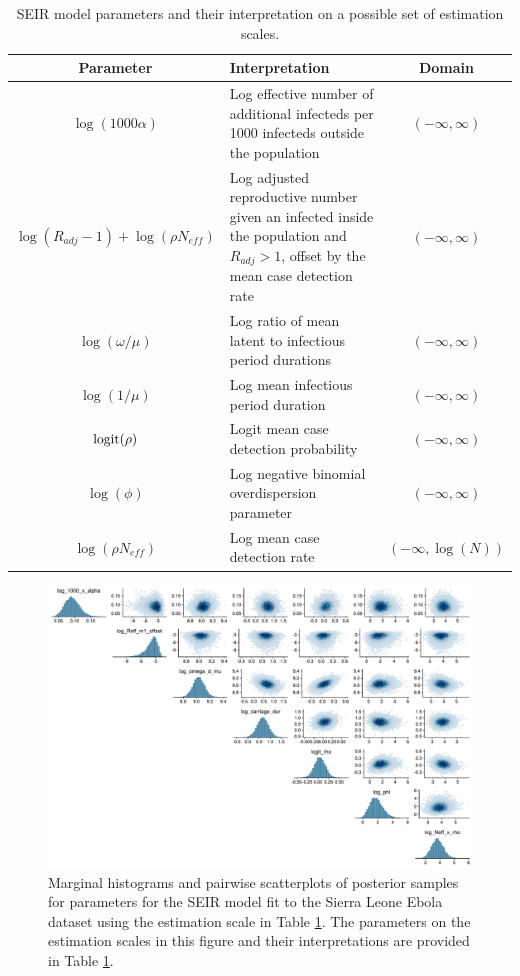\begin{table}[htbp]
	\caption{SEIR model parameters and their interpretation on a possible set of estimation scales.}
	\label{tab:seir_params_est3}
	\footnotesize
	\centering
	\begin{tabular}{clc}
		\hline
		\textbf{Parameter} & \textbf{Interpretation} & \textbf{Domain}\\
		\hline
		$\log(1000\alpha)$ & \makecell[l]{Log effective number of additional infecteds per \\ 1000 infecteds outside the population} & $(-\infty,\infty) $ \\
		$ \log(R_{adj} - 1) + \log(\rho N_{eff}) $ & \makecell[l]{Log adjusted reproductive number given an infected\\ inside the population and $ R_{adj} > 1 $, offset\\ by the mean case detection rate} & $(-\infty,\infty) $\\
		$ \log(\omega/\mu) $ & Log ratio of mean latent to infectious period durations & $(-\infty,\infty) $\\
		$ \log(1/\mu) $ & Log mean infectious period duration & $ (-\infty,\infty) $\\
		$ \mathrm{logit}(\rho) $ & Logit mean case detection probability & $(-\infty,\infty) $\\
		$ \log(\phi) $ & Log negative binomial overdispersion parameter & $ (-\infty,\infty) $ \\
		$ \log(\rho N_{eff}) $ & Log mean case detection rate & $(-\infty,\log(N))$\\
		\hline
	\end{tabular}
\end{table}

\begin{figure}[htbp]
	\centering
	\includegraphics[width=\linewidth]{figures/sln_pairs_t2}
	\caption[Posterior scatterplots for linear combinations of transformed Sierra Leone SEIR model parameters.]{Marginal histograms and pairwise scatterplots of posterior samples for parameters for the SEIR model fit to the Sierra Leone Ebola dataset using the estimation scale in Table \ref{tab:seir_params_est3}. The parameters on the estimation scales in this figure and their interpretations are provided in Table \ref{tab:seir_params_est3}.} 
	\label{fig:slpairs3}
\end{figure}

